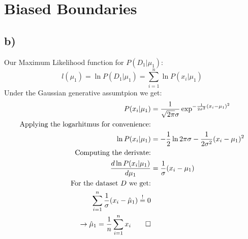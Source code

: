 \documentclass[paper=a4,fontsize=10pt,DIV11,BCOR10mm]{scrartcl}
\begin{document}
\section{Biased Boundaries}
\subsection*{b)}
	Our Maximum Likelihood function for $P(D_1|\mu_1)$:
	\[
	l(\mu_1) = \ln P(D_1|\mu_1) = \sum_{i=1}^n \ln P(x_i|\mu_1)
	\]
	Under the Gaussian generative assumtpion we get:
	\begin{align*}
		P(x_i|\mu_1) &= \frac{1}{\sqrt{2\pi}\sigma}\exp^{-\frac{1}{2\sigma^2}(x_i-\mu_1)^2}\\
	\text{Applying the logarhitmus for convenience:}&\\
		\ln P(x_i|\mu_1) &=-\frac{1}{2} \ln 2\pi \sigma -\frac{1}{2\sigma^2}(x_i-\mu_1)^2\\
	\text{Computing the derivate:}&\\
		\frac{d \ln P(x_i|\mu_1)}{d \mu_1} &= \frac{1}{\sigma}(x_i- \mu_1)\\
	\text{For the dataset $D$ we get:}&\\
	\sum_{i=1}^n \frac{1}{\sigma}(x_i- \hat{\mu}_1) \stackrel{!}{=} 0\\
	\rightarrow \hat{\mu}_1=\frac{1}{n} \sum_{i=1}^n x_i \qed
	\end{align*}






\end{document}
